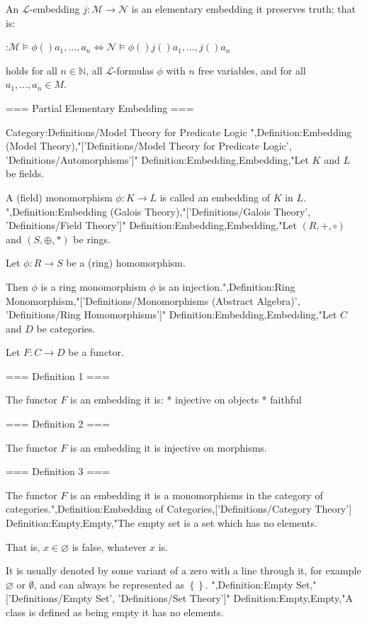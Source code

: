 An $\mathcal L$-embedding $j:\mathcal M \to \mathcal N$ is an elementary embedding  it preserves truth; that is:

:$\mathcal M \models \phi \left(   \right){a_1, \ldots, a_n} \iff \mathcal N \models \phi \left(   \right){j \left(   \right){a_1}, \ldots, j \left(   \right){a_n} }$

holds for all $n \in \mathbb N$, all $\mathcal L$-formulas $\phi$ with $n$ free variables, and for all $a_1, \ldots, a_n \in M$.


=== Partial Elementary Embedding ===




Category:Definitions/Model Theory for Predicate Logic
",Definition:Embedding (Model Theory),"['Definitions/Model Theory for Predicate Logic', 'Definitions/Automorphisms']"
Definition:Embedding,Embedding,"Let $K$ and $L$ be fields.

A (field) monomorphism $\phi: K \to L$ is called an embedding of $K$ in $L$.
",Definition:Embedding (Galois Theory),"['Definitions/Galois Theory', 'Definitions/Field Theory']"
Definition:Embedding,Embedding,"Let $\left( R, +, \circ \right)$ and $\left( S, \oplus, * \right)$ be rings.

Let $\phi: R \to S$ be a (ring) homomorphism.


Then $\phi$ is a ring monomorphism  $\phi$ is an injection.",Definition:Ring Monomorphism,"['Definitions/Monomorphisms (Abstract Algebra)', 'Definitions/Ring Homomorphisms']"
Definition:Embedding,Embedding,"Let $C$ and $D$ be categories.

Let $F : C \to D$ be a functor.


=== Definition 1 ===

The functor $F$ is an embedding  it is:
* injective on objects
* faithful


=== Definition 2 ===

The functor $F$ is an embedding  it is injective on morphisms.


=== Definition 3 ===

The functor $F$ is an embedding  it is a monomorphisms in the category of categories.",Definition:Embedding of Categories,['Definitions/Category Theory']
Definition:Empty,Empty,"The empty set is a set which has no elements.

That is, $x \in \varnothing$ is false, whatever $x$ is.


It is usually denoted by some variant of a zero with a line through it, for example $\varnothing$ or $\emptyset$, and can always be represented as $\left\lbrace  \right\rbrace$.
",Definition:Empty Set,"['Definitions/Empty Set', 'Definitions/Set Theory']"
Definition:Empty,Empty,"A class is defined as being empty  it has no elements.

